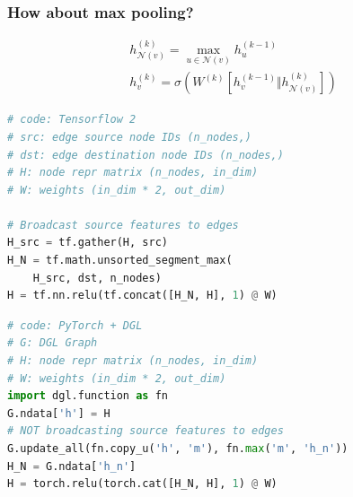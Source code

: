 \documentclass[10pt,aspectratio=169]{beamer}
\begin{document}
	\begin{frame}[fragile]
		\frametitle{How about max pooling?}
		
		\begin{minipage}{0.4\textwidth}
			$$
			\begin{gathered}
			h_{\mathcal{N}(v)}^{(k)} =
			\max_{u \in \mathcal{N}(v)} h^{(k-1)}_u \\
			h^{(k)}_v =
			\sigma \left( W^{(k)} \left[h_v^{(k-1)} \Vert h_{\mathcal{N}(v)}^{(k)}\right] \right)
			\end{gathered}
			$$
		\end{minipage}\hfill%
		\begin{minipage}{0.5\textwidth}
\begin{lstlisting}[language=Python]
# code: Tensorflow 2
# src: edge source node IDs (n_nodes,)
# dst: edge destination node IDs (n_nodes,)
# H: node repr matrix (n_nodes, in_dim)
# W: weights (in_dim * 2, out_dim)

# Broadcast source features to edges
H_src = tf.gather(H, src)
H_N = tf.math.unsorted_segment_max(
    H_src, dst, n_nodes)
H = tf.nn.relu(tf.concat([H_N, H], 1) @ W)
\end{lstlisting}

\begin{lstlisting}[language=Python]
# code: PyTorch + DGL
# G: DGL Graph
# H: node repr matrix (n_nodes, in_dim)
# W: weights (in_dim * 2, out_dim)
import dgl.function as fn
G.ndata['h'] = H
# NOT broadcasting source features to edges
G.update_all(fn.copy_u('h', 'm'), fn.max('m', 'h_n'))
H_N = G.ndata['h_n']
H = torch.relu(torch.cat([H_N, H], 1) @ W)
\end{lstlisting}
		\end{minipage}
	\end{frame}
\end{document}
